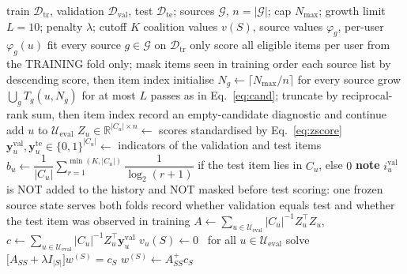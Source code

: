 \documentclass[pdflatex,sn-basic,Numbered]{sn-jnl}
\theoremstyle{plain}
\theoremstyle{definition}
\newcommand{\G}{\mathcal{G}}
\newcommand{\Ueval}{\mathcal{U}_{\mathrm{eval}}}
\begin{document}
\begin{algorithm}[tbp]
\caption{Exact ranking-stage SignalShap}\label{alg:signalshap}
\fontsize{8.5}{10}\selectfont
\begin{algorithmic}[1]
\Require train $\mathcal{D}_{\mathrm{tr}}$, validation $\mathcal{D}_{\mathrm{val}}$,
         test $\mathcal{D}_{\mathrm{te}}$; sources $\G$, $n=|\G|$; cap $N_{\max}$;
         growth limit $L=10$; penalty $\lambda$; cutoff $K$
\Ensure coalition values $v(S)$, source values $\varphi_g$, per-user $\varphi_g(u)$
\State fit every source $g \in \G$ on $\mathcal{D}_{\mathrm{tr}}$ only
\State score all eligible items per user from the TRAINING fold only; mask
       items seen in training 
  \State order each source list by descending score, then item index
  \State initialise $N_g\gets\lceil N_{\max}/n\rceil$ for every source
  \State grow $\bigcup_gT_g(u,N_g)$ for at most $L$ passes as in
         Eq.~\eqref{eq:cand}; truncate by reciprocal-rank sum, then item index
    \State record an empty-candidate diagnostic and continue
  \EndIf
  \State add $u$ to $\Ueval$
  \State $Z_u \in \mathbb{R}^{|C_u| \times n} \gets$ scores standardised by
         Eq.~\eqref{eq:zscore} 
  \State $\mathbf{y}^{\mathrm{val}}_u, \mathbf{y}^{\mathrm{te}}_u \in \{0,1\}^{|C_u|}
         \gets$ indicators of the validation and test items
  \State $b_u \gets \dfrac{1}{|C_u|}\sum_{r=1}^{\min(K,|C_u|)}\dfrac{1}{\log_2(r+1)}$
         if the test item lies in $C_u$, else $0$
  \State \textbf{note} $i_u^{\mathrm{val}}$ is NOT added to the history and NOT
         masked before test scoring: one frozen source state serves both folds
  \State record whether validation equals test and whether the test item was
         observed in training
\EndFor
\State $A \gets \sum_{u\in\Ueval} |C_u|^{-1} Z_u^\top Z_u$, \quad
       $c \gets \sum_{u\in\Ueval} |C_u|^{-1} Z_u^\top \mathbf{y}^{\mathrm{val}}_u$
\For{each $S \subseteq \G$}
    \State $v_u(S) \gets 0$ \ for all $u\in\Ueval$
  \Else
      \State solve $\bigl[A_{SS} + \lambda I_{|S|}\bigr]w^{(S)}=c_S$
    \Else
      \State $w^{(S)} \gets A_{SS}^{+} c_S$

\end{algorithmic}
\end{algorithm}
\end{document}
